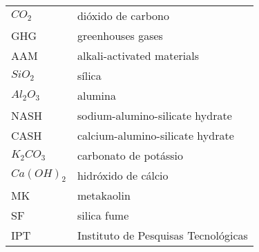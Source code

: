 \begin{longtable}{ll}
$CO_2$ & dióxido de carbono \\
GHG & greenhouses gases \\
AAM & alkali-activated materials \\
$ SiO_2$ & sílica \\
$ Al_2O_3$ & alumina \\
NASH & sodium-alumino-silicate hydrate \\
CASH & calcium-alumino-silicate hydrate \\
$K_2CO_3$ & carbonato de potássio \\
$Ca(OH)_2$ & hidróxido de cálcio \\
MK & metakaolin \\
SF & silica fume \\
IPT & Instituto de Pesquisas Tecnológicas \\

\end{longtable}

